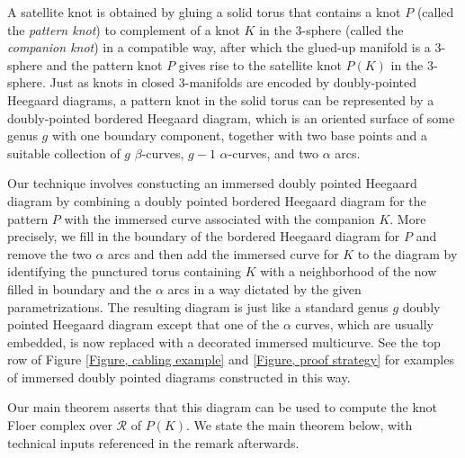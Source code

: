\documentclass{amsart}
\theoremstyle{definition}
\theoremstyle{remark}
\numberwithin{equation}{section}
\numberwithin{equation}{section} \makeatletter
\begin{document}
A satellite knot is obtained by gluing a solid torus that contains a knot $P$ (called the \textit{pattern knot}) to complement of a knot $K$ in the 3-sphere (called the \textit{companion knot}) in a compatible way, after which the glued-up manifold is a 3-sphere and the pattern knot $P$ gives rise to the satellite knot $P(K)$ in the 3-sphere. Just as knots in closed 3-manifolds are encoded by doubly-pointed Heegaard diagrams, a pattern knot in the solid torus can be represented by a doubly-pointed bordered Heegaard diagram, which is an oriented surface of some genus $g$ with one boundary component, together with two base points and a suitable collection of $g$ $\beta$-curves, $g-1$ $\alpha$-curves, and two $\alpha$ arcs.

Our technique involves constucting an immersed doubly pointed Heegaard diagram by combining a doubly pointed bordered Heegaard diagram for the pattern $P$ with the immersed curve associated with the companion $K$. More precisely, we fill in the boundary of the bordered Heegaard diagram for $P$ and remove the two $\alpha$ arcs and then add the immersed curve for $K$ to the diagram by identifying the punctured torus containing $K$ with a neighborhood of the now filled in boundary and the $\alpha$ arcs in a way dictated by the given parametrizations. The resulting diagram is just like a standard genus $g$ doubly pointed Heegaard diagram except that one of the $\alpha$ curves, which are usually embedded, is now replaced with a decorated immersed multicurve. See the top row of Figure \ref{Figure, cabling example} and \ref{Figure, proof strategy} for examples of immersed doubly pointed diagrams constructed in this way.

Our main theorem asserts that this diagram can be used to compute the knot Floer complex over $\mathcal{R}$ of $P(K)$. We state the main theorem below, with technical inputs referenced in the remark afterwards.
\end{document}
